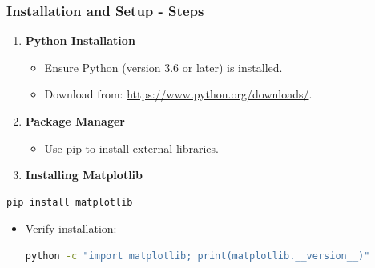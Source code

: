 \documentclass{beamer}
\begin{document}
\begin{frame}[fragile]
    \frametitle{Installation and Setup - Steps}
    \begin{enumerate}
        \item \textbf{Python Installation}
            \begin{itemize}
                \item Ensure Python (version 3.6 or later) is installed.
                \item Download from: \url{https://www.python.org/downloads/}.
            \end{itemize}
        
        \item \textbf{Package Manager}
            \begin{itemize}
                \item Use pip to install external libraries.
            \end{itemize}
        
        \item \textbf{Installing Matplotlib}
        \end{enumerate}
        \begin{lstlisting}[language=bash]
pip install matplotlib
        \end{lstlisting}
        \begin{itemize}
            \item Verify installation:
            \begin{lstlisting}[language=bash]
python -c "import matplotlib; print(matplotlib.__version__)"
            \end{lstlisting}
        \end{itemize}
\end{frame}
\end{document}
